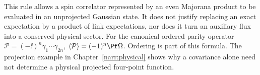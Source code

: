 This rule allows a spin correlator represented by an even Majorana product to
be evaluated in an unprojected Gaussian state. It does not justify replacing
an exact expectation by a product of link expectations, nor does it turn an
auxiliary flux into a conserved physical sector. For the canonical ordered
parity operator $\mathcal P=(-\ii)^n\gamma_1\cdots\gamma_{2n}$,
$\langle\mathcal P\rangle=(-1)^n\Pf\Omega$. Ordering is part of this formula.
The projection example in Chapter~\ref{narr:physical} shows why a covariance
alone need not determine a physical projected four-point function.
